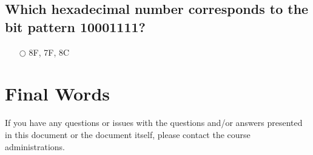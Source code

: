 \documentclass[a4paper,11pt,oneside]{article}
\begin{document}
\begin{sloppypar}
\subsection{Which hexadecimal number corresponds to the bit pattern 10001111?}

\label{q:444:mc:en:True}

\begin{itemize}
  \item[$\bigcirc$] 8F, 7F, 8C
\end{itemize}









\section{Final Words}
\label{finalWords}
If you have any questions or issues with the questions and/or answers presented in this document or the document itself, please contact the course administrations.

\pagebreak



\end{sloppypar}
\end{document}
